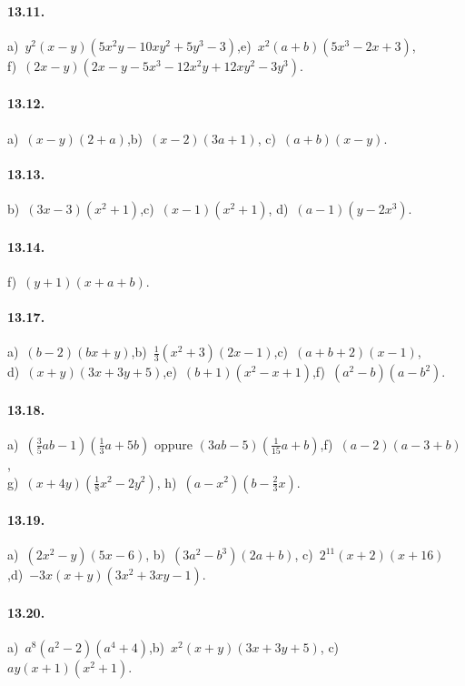 \paragraph{13.11.}
a)~$y^{2}(x-y)\left(5x^{2}y-10xy^{2}+5y^{3}-3\right)$,\quad e)~$x^{2}(a+b)(5x^{3}-2x+3)$,\protect\\ f)~$(2x-y)\left(2x-y-5x^3-12x^2y+12xy^2-3y^3\right)$.

\paragraph{13.12.}
a)~$(x-y)(2+a)$,\quad b)~$(x-2)(3a+1)$, \quad c)~$(a+b)(x-y)$.

\paragraph{13.13.}
b)~$(3x-3)\left(x^2+1\right)$,\quad c)~$(x-1)\left(x^{2}+1\right)$, \quad d)~$(a-1)\left(y-2x^{3}\right)$.

\paragraph{13.14.}
f)~$(y+1)(x+a+b)$.

\paragraph{13.17.}
a)~$(b-2)(bx+y)$,\quad b)~$\frac{1}{3}\left(x^{2}+3\right)(2x-1)$,\quad c)~$(a+b+2)(x-1)$,\protect\\ d)~$(x+y)(3x+3y+5)$,\quad e)~$(b+1)(x^{2}-x+1)$,\quad f)~$\left(a^{2}-b\right)\left(a-b^{2}\right)$.

\paragraph{13.18.}
a)~$\left(\frac{3}{5}ab-1\right)\left(\frac{1}{3}a+5b\right)$ oppure $(3ab-5)\left(\frac{1}{15}a+b\right)$,\quad f)~$(a-2)(a-3+b)$,\protect\\ g)~$(x+4y)\left(\frac{1}{8}x^2-2y^2\right)$, \quad h)~$\left(a-x^2\right)\left(b-\frac{2}{3}x\right)$.

\paragraph{13.19.}
a)~$\left(2x^2-y\right)(5x-6)$, \quad b)~$(3a^2-b^3)(2a+b)$, \quad c)~$2^{11}(x+2)(x+16)$,\quad d)~$-3x(x+y)\left(3x^2+3xy-1\right)$.

\paragraph{13.20.}
a)~$a^{8}\left(a^{2}-2\right)\left(a^{4}+4\right)$,\quad b)~$x^{2}(x+y)(3x+3y+5)$, \quad c)~$ay(x+1)(x^{2}+1)$.


